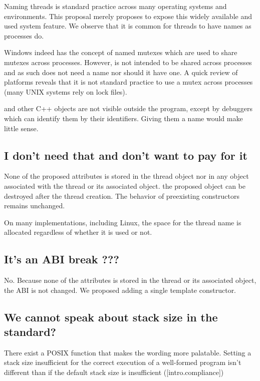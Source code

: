 \documentclass{wg21}
\begin{document}
Naming threads is standard practice across many operating systems and environments.
This proposal merely proposes to expose this widely available and used system feature.
We observe that it is common for threads to have names as processes do.

Windows indeed has the concept of named mutexes which are used to share mutexes across processes.
However,  is not intended to be shared across processes and as such does not need
a name nor should it have one.
A quick review of platforms reveals that it is not standard practice to use a mutex across processes (many UNIX systems rely on lock files).

 and other C++ objects are not visible outside the program, except by debuggers which can identify them
by their identifiers. Giving them a name would make little sense.


\subsection{I don't need that and don't want to pay for it}

None of the proposed attributes is stored in the thread object nor in any object associated with the thread or its associated  object.
the proposed  object can be destroyed after the thread creation.
The behavior of preexisting constructors remains unchanged.

On many implementations, including Linux, the space for the thread name is allocated regardless of whether it is used or not.

\subsection{It's an ABI break ???}

No.
Because none of the attributes is stored in the thread or its associated  object, the ABI is not changed.
We proposed adding a single template constructor.


\subsection{We cannot speak about stack size in the standard?}
There exist a POSIX function that makes the wording more palatable.
Setting a stack size insufficient for the correct execution of a well-formed program isn't different
than if the default stack size is insufficient ([intro.compliance])
\end{document}
